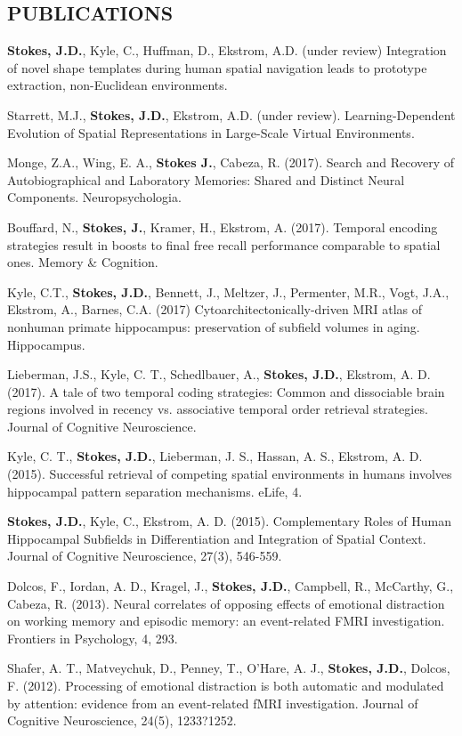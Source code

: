 \documentclass[line,margin,10pt]{res}
\begin{document}
\begin{resume}
\section{PUBLICATIONS}

\textbf{Stokes, J.D.}, Kyle, C., Huffman, D., Ekstrom, A.D. (under review) Integration of novel shape templates during human spatial navigation leads to prototype extraction, non-Euclidean environments.

Starrett, M.J., \textbf{Stokes, J.D.}, Ekstrom, A.D. (under review). Learning-Dependent Evolution of Spatial Representations in Large-Scale Virtual Environments.

Monge, Z.A., Wing, E. A., \textbf{Stokes J.}, Cabeza, R. (2017). Search and Recovery of Autobiographical and Laboratory Memories: Shared and Distinct Neural Components. Neuropsychologia.

Bouffard, N., \textbf{Stokes, J.}, Kramer, H., Ekstrom, A. (2017). Temporal encoding strategies result in boosts to final free recall performance comparable to spatial ones. Memory \& Cognition.

Kyle, C.T., \textbf{Stokes, J.D.}, Bennett, J., Meltzer, J., Permenter, M.R., Vogt, J.A., Ekstrom, A., Barnes, C.A. (2017) Cytoarchitectonically-driven MRI atlas of nonhuman primate hippocampus:  preservation of subfield volumes in aging. Hippocampus. 

Lieberman, J.S., Kyle, C. T., Schedlbauer, A., \textbf{Stokes, J.D.}, Ekstrom, A. D. (2017). A tale of two temporal coding strategies: Common and dissociable brain regions involved in recency vs. associative temporal order retrieval strategies. Journal of Cognitive Neuroscience.

Kyle, C. T., \textbf{Stokes, J.D.}, Lieberman, J. S., Hassan, A. S., Ekstrom, A. D. (2015). Successful retrieval of competing spatial environments in humans involves hippocampal pattern separation mechanisms. eLife, 4. 

\textbf{Stokes, J.D.}, Kyle, C., Ekstrom, A. D. (2015). Complementary Roles of Human Hippocampal Subfields in Differentiation and Integration of Spatial Context. Journal of Cognitive Neuroscience, 27(3), 546-559. 

Dolcos, F., Iordan, A. D., Kragel, J., \textbf{Stokes, J.D.}, Campbell, R., McCarthy, G., Cabeza, R. (2013). Neural correlates of opposing effects of emotional distraction on working memory and episodic memory: an event-related FMRI investigation. Frontiers in Psychology, 4, 293. 

Shafer, A. T., Matveychuk, D., Penney, T., O'Hare, A. J., \textbf{Stokes, J.D.}, Dolcos, F. (2012). Processing of emotional distraction is both automatic and modulated by attention: evidence from an event-related fMRI investigation. Journal of Cognitive Neuroscience, 24(5), 1233?1252.
 		

\end{resume}
\end{document}
